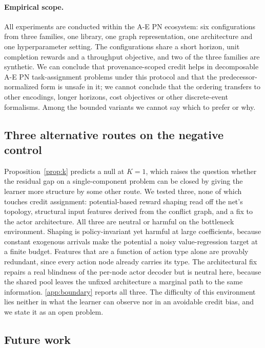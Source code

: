 \documentclass[review,authoryear,3p,times]{elsarticle}
\begin{document}
\paragraph{Empirical scope.} All experiments are conducted within the A-E PN
ecosystem: six configurations from three families, one library, one graph
representation, one architecture and one hyperparameter setting. The
configurations share a short horizon, unit completion rewards and a throughput
objective, and two of the three families are synthetic. We can conclude that
provenance-scoped credit helps in decomposable A-E PN task-assignment problems
under this protocol and that the predecessor-normalized form is unsafe in it;
we cannot conclude that the ordering transfers to other encodings, longer
horizons, cost objectives or other discrete-event formalisms. Among the bounded
variants we cannot say which to prefer or why.

\subsection{Three alternative routes on the negative control}
\label{sec:boundary}

Proposition~\ref{prop:k} predicts a null at $K=1$, which raises the question
whether the residual gap on a single-component problem can be closed by giving
the learner more structure by some other route. We tested three, none of which
touches credit assignment: potential-based reward shaping read off the net's
topology, structural input features derived from the conflict graph, and a fix
to the actor architecture. All three are neutral or harmful on the bottleneck
environment. Shaping is policy-invariant \citep{ng1999shaping} yet harmful at
large coefficients, because constant exogenous arrivals make the potential a
noisy value-regression target at a finite budget. Features that are a function
of action type alone are provably redundant, since every action node already
carries its type. The architectural fix repairs a real blindness of the
per-node actor decoder but is neutral here, because the shared pool leaves the
unfixed architecture a marginal path to the same information.
\ref{app:boundary} reports all three. The difficulty of this environment lies
neither in what the learner can observe nor in an avoidable credit bias, and
we state it as an open problem.

\subsection{Future work}
\end{document}
